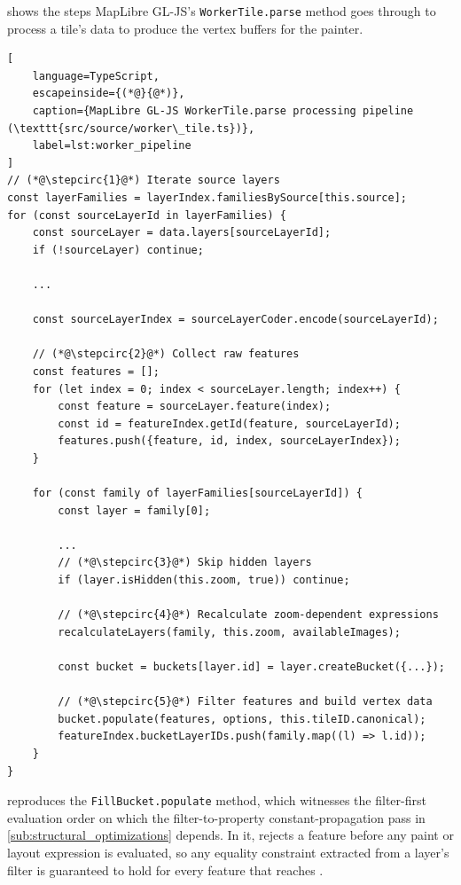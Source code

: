 \clearpage

 shows the steps MapLibre GL-JS's \texttt{WorkerTile.parse} method goes through to process a tile's data to produce the vertex buffers for the painter.

\begin{lstlisting}[
    language=TypeScript,
    escapeinside={(*@}{@*)},
    caption={MapLibre GL-JS WorkerTile.parse processing pipeline (\texttt{src/source/worker\_tile.ts})},
    label=lst:worker_pipeline
]
// (*@\stepcirc{1}@*) Iterate source layers
const layerFamilies = layerIndex.familiesBySource[this.source];
for (const sourceLayerId in layerFamilies) {
    const sourceLayer = data.layers[sourceLayerId];
	if (!sourceLayer) continue;

    ...

    const sourceLayerIndex = sourceLayerCoder.encode(sourceLayerId);

    // (*@\stepcirc{2}@*) Collect raw features
    const features = [];
    for (let index = 0; index < sourceLayer.length; index++) {
        const feature = sourceLayer.feature(index);
        const id = featureIndex.getId(feature, sourceLayerId);
        features.push({feature, id, index, sourceLayerIndex});
    }

    for (const family of layerFamilies[sourceLayerId]) {
        const layer = family[0];

        ...
        // (*@\stepcirc{3}@*) Skip hidden layers
        if (layer.isHidden(this.zoom, true)) continue;

        // (*@\stepcirc{4}@*) Recalculate zoom-dependent expressions
        recalculateLayers(family, this.zoom, availableImages);

        const bucket = buckets[layer.id] = layer.createBucket({...});

        // (*@\stepcirc{5}@*) Filter features and build vertex data
        bucket.populate(features, options, this.tileID.canonical);
        featureIndex.bucketLayerIDs.push(family.map((l) => l.id));
    }
}
\end{lstlisting}

\clearpage

 reproduces the \texttt{FillBucket.populate} method, which witnesses the filter-first evaluation order on which the filter-to-property constant-propagation pass in \cref{sub:structural_optimizations} depends.
In it,  rejects a feature before any paint or layout expression is evaluated, so any equality constraint extracted from a layer's filter is guaranteed to hold for every feature that reaches .

